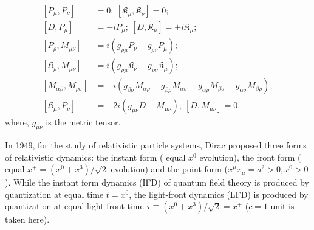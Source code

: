 \documentclass[foundations,article,submit,pdftex,moreauthors]{Definitions/mdpi}
\begin{document}
\begin{align}\label{conformalalgebra}
    \left[P_{{\mu}},P_{{\nu}}\right]&=0;~\left[\mathfrak{K}_{{\mu}},\mathfrak{K}_{{\nu}}\right]=0;\nonumber\\
 \left[D, P_{{\mu}}\right]&=-iP_{{\mu}};~\left[D, \mathfrak{K}_{{\mu}}\right]=+i\mathfrak{K}_{{\mu}};\nonumber\\
 \left[P_{{\rho}},M_{{\mu}{\nu}}\right]&=i\left(g_{{\rho}{\mu}}P_{{\nu}}-g_{{\rho}{\nu}}P_{{\mu}}\right);\nonumber\\
 \left[\mathfrak{K}_{{\rho}},M_{{\mu}{\nu}}\right]&=i\left(g_{{\rho}{\mu}}\mathfrak{K}_{{\nu}}-g_{{\rho}{\nu}}\mathfrak{K}_{{\mu}}\right);\nonumber\\
 \left[M_{{\alpha}{\beta}},M_{{\rho}{\sigma}}\right]&=-i\left(g_{{\beta}{\sigma}}M_{{\alpha}{\rho}}-g_{{\beta}{\rho}}M_{{\alpha}{\sigma}}+g_{{\alpha}{\rho}}M_{{\beta}{\sigma}}-g_{{\alpha}{\sigma}}M_{{\beta}{\rho}}\right);\nonumber\\
 \left[\mathfrak{K}_{{\mu}},P_{{\nu}}\right]&=-2i\left(g_{{\mu}{\nu}}D+M_{{\mu}{\nu}}\right);~\left[D, M_{{\mu}{\nu}}\right]=0.
\end{align}
where, $g_{\mu\nu}$ is the metric tensor.


In 1949, for the study of relativistic particle systems, Dirac \cite{Dirac1949} proposed three forms of relativistic dynamics: the instant form 
({ equal $x^0$ evolution}), the front form ({ equal $x^{+}=(x^{0}+x^{3})/\sqrt{2}$ evolution}) and the point form ($x^{\mu}x_{\mu}=a^{2}>0, x^{0}>0$).
While the instant form dynamics (IFD) of quantum field theory is produced by quantization at equal time $t=x^{0}$, the light-front dynamics (LFD) is produced by quantization at equal light-front time $\tau \equiv (x^{0}+x^{3})/\sqrt{2}=x^{+}$ ($c=1$ unit is taken here).
\end{document}
